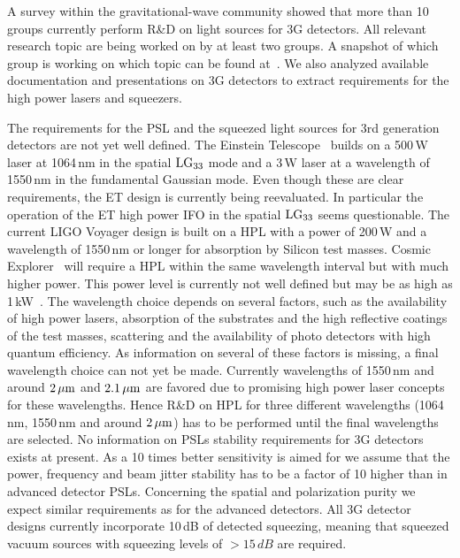 

A survey within the gravitational-wave community showed that more than 10 groups currently perform R\&D on light sources for 3G detectors. All relevant research topic are being worked on by at least two groups. A snapshot of which group is working on which topic can be found at~\cite{LightSource_RD_table}. We also analyzed available documentation and presentations on 3G detectors to extract requirements for the high power lasers and squeezers.

The requirements for the PSL and the squeezed light sources for 3rd generation detectors are not yet well defined. The Einstein Telescope~\cite{ET2011} builds on a 500\,W laser at 1064\,nm in the spatial $\rm LG_{33}$ mode and a 3\,W laser at a wavelength of 1550\,nm in the fundamental Gaussian mode.
Even though these are clear requirements, the ET design is currently being reevaluated. In particular the operation of the ET high power IFO in the spatial $\rm LG_{33}$ seems questionable. The current  LIGO Voyager design is built on a HPL with a power of 200\,W and a wavelength of 1550\,nm or longer for absorption by Silicon test masses. Cosmic Explorer~\cite{CosmicExplorer2017} will require a HPL within the same wavelength interval but with much higher power. This power level is currently not well defined but may be as high as 1\,kW~\cite{GWADW2018,ISWP:2018}. The wavelength choice depends on several factors, such as the availability of high power lasers, absorption of the substrates and the high reflective coatings of the test masses, scattering and the availability of photo detectors with high quantum efficiency. As information on several of these factors is missing, a final wavelength choice can not yet be made. Currently wavelengths of 1550\,nm and around $\rm 2\, \mu m $ and $\rm 2.1\, \mu m $ are favored due to promising high power laser concepts for these wavelengths. Hence R\&D on HPL for three different wavelengths (1064\,nm, 1550\,nm and around $\rm 2\, \mu m $) has to be performed until the final wavelengths are selected. 
No information on PSLs stability requirements for 3G detectors exists at present. As a 10 times better sensitivity is aimed for we assume that the power, frequency and beam jitter stability has to be a factor of 10 higher than in advanced detector PSLs. Concerning the spatial and polarization purity we expect similar requirements as for the advanced detectors.
All 3G detector designs currently incorporate 10\,dB of detected squeezing, meaning that squeezed vacuum sources with squeezing levels of $> 15\,dB$ are required.


